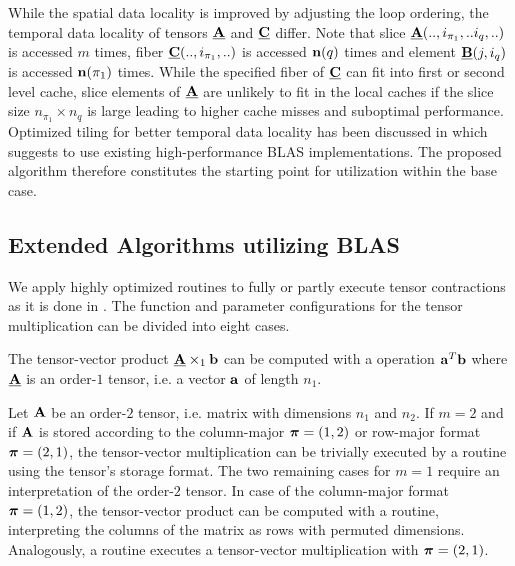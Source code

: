 While the spatial data locality is improved by adjusting the loop ordering, the temporal data locality of tensors $\underline{\mathbf{A}}$ and $\underline{\mathbf{C}}$ differ.
Note that slice $\underline{\mathbf{A}}(..,i_{\pi_1},..i_q,..)$ is accessed $m$ times, fiber $\underline{\mathbf{C}}(..,i_{\pi_1},..)$ is accessed $\mathbf{n}(q)$ times and element $\underline{\mathbf{B}}(j,i_q)$ is accessed $\mathbf{n}(\pi_1)$ times.
While the specified fiber of $\underline{\mathbf{C}}$ can fit into first or second level cache, slice elements of $\underline{\mathbf{A}}$ are unlikely to fit in the local caches if the slice size $n_{\pi_1} \times n_q$ is large leading to higher cache misses and suboptimal performance.
Optimized tiling for better temporal data locality has been discussed in \cite{goto:2008:gemm} which suggests to use existing high-performance BLAS implementations.
The proposed algorithm therefore constitutes the starting point for  utilization within the base case.

\subsection{Extended Algorithms utilizing BLAS}
\label{subsec:linear.algebra.routines}
\vspace{-0.3em}
We apply highly optimized routines to fully or partly execute tensor contractions as it is done in \cite{li:2015:input, shi:2016:tensor.contraction}.
The function and parameter configurations for the tensor multiplication can be divided into eight cases.

The tensor-vector product $\underline{\mathbf{A}} \times_1 \mathbf{b}$ can be computed with a  operation $\mathbf{a}^T \mathbf{b}$ where $\underline{\mathbf{A}}$ is an order-$1$ tensor, i.e. a vector $\mathbf{a}$ of length $n_1$.

Let $\mathbf{A}$ be an order-$2$ tensor, i.e. matrix with dimensions $n_1$ and $n_2$.
If $m=2$ and if $\mathbf{A}$ is stored according to the column-major $\boldsymbol{\pi}=(1,2)$ or row-major format $\boldsymbol{\pi}=(2,1)$, the tensor-vector multiplication can be trivially executed by a  routine using the tensor's storage format.
The two remaining cases for $m=1$ require an interpretation of the order-$2$ tensor. 
In case of the column-major format $\boldsymbol{\pi}=(1,2)$, the tensor-vector product can be computed with a  routine, interpreting the columns of the matrix as rows with permuted dimensions.
Analogously, a  routine executes a tensor-vector multiplication with $\boldsymbol{\pi}=(2,1)$.

